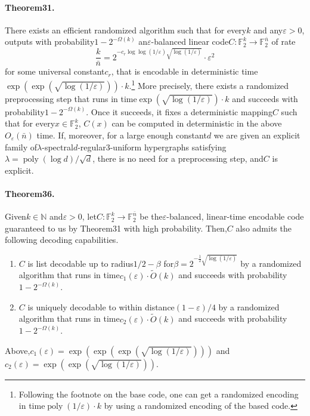 \paragraph{Theorem31.} There exists an efficient randomized algorithm such that for every$k$ and any$\varepsilon>0$, outputs with probability$1-2^{-\Omega(k)}$ an$\varepsilon$-balanced linear code$C:\mathbb F_2^k\to\mathbb F_2^{\bar n}$ of rate
\[\frac k{\bar n}=2^{-c_r\log\log(1/\varepsilon)\sqrt{\log(1/\varepsilon)}}\cdot\varepsilon^2\]
for some universal constant$c_r$, that is encodable in deterministic time$\exp(\exp(\sqrt{\log(1/\varepsilon)}))\cdot k$.\footnote{Following the footnote on the base code, one can get a randomized encoding in time$\operatorname{poly}(1/\varepsilon)\cdot k$ by using a randomized encoding of the based code.} More precisely, there exists a randomized preprocessing step that runs in time$\exp(\sqrt{\log(1/\varepsilon)})\cdot k$ and succeeds with probability$1-2^{-\Omega(k)}$. Once it succeeds, it fixes a deterministic mapping$C$ such that for every$x\in\mathbb F_2^k$, $C(x)$ can be computed in deterministic in the above$O_{\varepsilon}(\bar n)$ time.
If, moreover, for a large enough constant$d$ we are given an explicit family of$\lambda$-spectral$d$-regular3-uniform hypergraphs satisfying$\lambda=\operatorname{poly}(\log d)/\sqrt d$, there is no need for a preprocessing step, and$C$ is explicit.
\paragraph{Theorem36.} Given$k\in\mathbb N$ and$\varepsilon>0$, let$C:\mathbb F_2^k\to\mathbb F_2^{\bar n}$ be the$\varepsilon$-balanced, linear-time encodable code guaranteed to us by Theorem31 with high probability. Then,$C$ also admits the following decoding capabilities.
\begin{enumerate}
\item $C$ is list decodable up to radius$1/2-\beta$ for$\beta=2^{-\frac12\sqrt{\log(1/\varepsilon)}}$ by a randomized algorithm that runs in time$c_1(\varepsilon)\cdot\widetilde O(k)$ and succeeds with probability$1-2^{-\Omega(k)}$.
\item $C$ is uniquely decodable to within distance$(1-\varepsilon)/4$ by a randomized algorithm that runs in time$c_2(\varepsilon)\cdot\widetilde O(k)$ and succeeds with probability$1-2^{-\Omega(k)}$.
\end{enumerate}
Above,$c_1(\varepsilon)=\exp(\exp(\exp(\sqrt{\log(1/\varepsilon)})))$ and$c_2(\varepsilon)=\exp(\exp(\sqrt{\log(1/\varepsilon)}))$.
